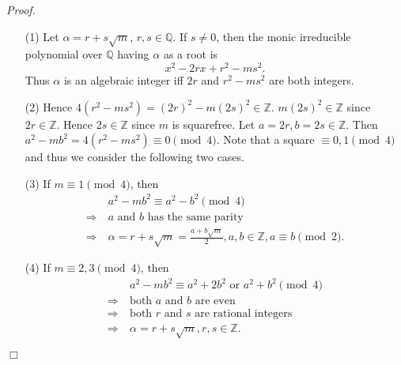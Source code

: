 \documentclass{article}
\begin{document}
\emph{Proof.}
\begin{enumerate}
\item[(1)]
  Let $\alpha = r + s\sqrt{m}$, $r, s \in \mathbb{Q}$.
  If $s \neq 0$, then the monic irreducible polynomial over $\mathbb{Q}$ having $\alpha$ as a root is
  \[
    x^2 - 2rx + r^2 - ms^2.
  \]
  Thus $\alpha$ is an algebraic integer iff $2r$ and $r^2 - ms^2$ are both integers.

\item[(2)]
  Hence $4(r^2 - ms^2) = (2r)^2 - m(2s)^2 \in \mathbb{Z}$.
  $m(2s)^2 \in \mathbb{Z}$ since $2r \in \mathbb{Z}$.
  Hence $2s \in \mathbb{Z}$ since $m$ is squarefree.
  Let $a = 2r, b = 2s \in \mathbb{Z}$.
  Then $a^2 - mb^2 = 4(r^2 - ms^2) \equiv 0 \pmod 4$.
  Note that a square $\equiv 0, 1 \pmod 4$ and thus we consider the following two cases.

\item[(3)]
  If $m \equiv 1 \pmod 4$, then
  \begin{align*}
    &\:a^2 - mb^2 \equiv a^2 - b^2 \pmod 4 \\
    \Longrightarrow &\:
    \text{$a$ and $b$ has the same parity} \\
    \Longrightarrow &\:
    \alpha = r + s\sqrt{m} = \frac{a + b\sqrt{m}}{2}, a, b \in \mathbb{Z}, a \equiv b \pmod 2.
  \end{align*}

\item[(4)]
  If $m \equiv 2, 3 \pmod 4$, then
  \begin{align*}
    &\:a^2 - mb^2 \equiv a^2+2b^2 \text{ or } a^2+b^2 \pmod 4 \\
    \Longrightarrow &\:
    \text{both $a$ and $b$ are even} \\
    \Longrightarrow &\:
    \text{both $r$ and $s$ are rational integers} \\
    \Longrightarrow &\:
    \alpha = r + s\sqrt{m}, r, s \in \mathbb{Z}.
  \end{align*}
\end{enumerate}
$\Box$ \\\\
\end{document}
